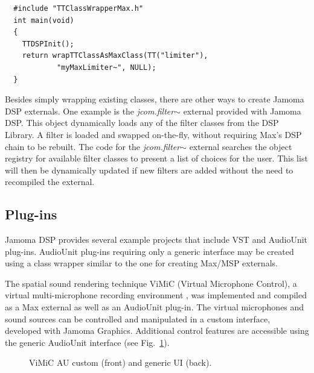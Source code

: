 \documentclass[twoside,10pt]{article}
\begin{document}
\begin{lstlisting}
  #include "TTClassWrapperMax.h"
  int main(void)
  {
    TTDSPInit();
    return wrapTTClassAsMaxClass(TT("limiter"), 
            "myMaxLimiter~", NULL);
  }
\end{lstlisting}

\noindent Besides simply wrapping existing classes, there are other ways to create Jamoma DSP externals. One example is the \emph{\small{jcom.filter$\sim$}} external provided with Jamoma DSP.  
This object dynamically loads any of the filter classes from the DSP Library. A filter is loaded and swapped on-the-fly, without requiring Max's DSP chain to be rebuilt.  The code for the \emph{\small{jcom.filter$\sim$}} external searches the object registry for available filter classes to present a list of choices for the user. This list will then be dynamically updated if new filters are added without the need to recompiled the external.   



\subsection{Plug-ins}

Jamoma DSP provides several example projects that include VST and AudioUnit plug-ins.  AudioUnit plug-ins requiring only a generic interface may be created using a class wrapper similar to the one for creating Max/MSP externals.  

The spatial sound rendering technique ViMiC (Virtual Microphone Control), a virtual multi-microphone recording environment \cite{CMJ08-VIMIC}, was implemented and compiled as a Max external as well as an AudioUnit plug-in. The virtual microphones and sound sources can be controlled and manipulated in a custom interface, developed with Jamoma Graphics.  Additional control features are accessible using the generic AudioUnit interface (see Fig.~\ref{fig:vimic}).


\begin{figure}[htbp]
\centerline{}
\caption{ViMiC AU custom (front) and generic UI (back).}
\label{fig:vimic}
\end{figure}
\end{document}
